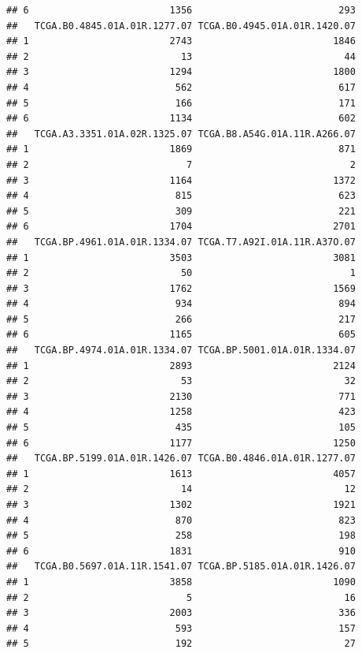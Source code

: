 \documentclass[
]{article}
\begin{document}
\begin{verbatim}
## 6                         1356                          293
##   TCGA.B0.4845.01A.01R.1277.07 TCGA.B0.4945.01A.01R.1420.07
## 1                         2743                         1846
## 2                           13                           44
## 3                         1294                         1800
## 4                          562                          617
## 5                          166                          171
## 6                         1134                          602
##   TCGA.A3.3351.01A.02R.1325.07 TCGA.B8.A54G.01A.11R.A266.07
## 1                         1869                          871
## 2                            7                            2
## 3                         1164                         1372
## 4                          815                          623
## 5                          309                          221
## 6                         1704                         2701
##   TCGA.BP.4961.01A.01R.1334.07 TCGA.T7.A92I.01A.11R.A37O.07
## 1                         3503                         3081
## 2                           50                            1
## 3                         1762                         1569
## 4                          934                          894
## 5                          266                          217
## 6                         1165                          605
##   TCGA.BP.4974.01A.01R.1334.07 TCGA.BP.5001.01A.01R.1334.07
## 1                         2893                         2124
## 2                           53                           32
## 3                         2130                          771
## 4                         1258                          423
## 5                          435                          105
## 6                         1177                         1250
##   TCGA.BP.5199.01A.01R.1426.07 TCGA.B0.4846.01A.01R.1277.07
## 1                         1613                         4057
## 2                           14                           12
## 3                         1302                         1921
## 4                          870                          823
## 5                          258                          198
## 6                         1831                          910
##   TCGA.B0.5697.01A.11R.1541.07 TCGA.BP.5185.01A.01R.1426.07
## 1                         3858                         1090
## 2                            5                           16
## 3                         2003                          336
## 4                          593                          157
## 5                          192                           27

\end{verbatim}
\end{document}
